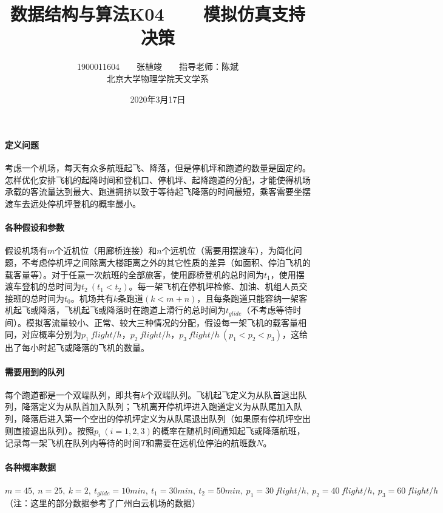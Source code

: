 \documentclass[a4 paper,fontset=windows]{ctexart}
\begin{document}
	\title{\textbf{数据结构与算法K04\ \ \ \ 模拟仿真支持决策}}
	\author{1900011604\ \ \ \ 张植竣\ \ \ \ 指导老师：陈斌\\北京大学物理学院天文学系}
	\date{2020年3月17日}
	\maketitle
	
	\paragraph{定义问题}考虑一个机场，每天有众多航班起飞、降落，但是停机坪和跑道的数量是固定的。怎样优化安排飞机的起降时间和登机口、停机坪、起降跑道的分配，才能使得机场承载的客流量达到最大、跑道拥挤以致于等待起飞降落的时间最短，乘客需要坐摆渡车去远处停机坪登机的概率最小。
	
	\paragraph{各种假设和参数}假设机场有$m$个近机位（用廊桥连接）和$n$个远机位（需要用摆渡车），为简化问题，不考虑停机坪之间除离大楼距离之外的其它性质的差异（如面积、停泊飞机的载客量等）。对于任意一次航班的全部旅客，使用廊桥登机的总时间为$t_1$，使用摆渡车登机的总时间为$t_2\ (t_1<t_2)$。每一架飞机在停机坪检修、加油、机组人员交接班的总时间为$t_0$。机场共有$k$条跑道$(k<m+n)$，且每条跑道只能容纳一架客机起飞或降落，飞机起飞或降落时在跑道上滑行的总时间为$t_{glide}$（不考虑等待时间）。模拟客流量较小、正常、较大三种情况的分配，假设每一架飞机的载客量相同，对应概率分别为$p_1\ flight/h$，$p_2\ flight/h$，$p_3\ flight/h\ (p_1<p_2<p_3)$，这给出了每小时起飞或降落的飞机的数量。	
	
	\paragraph{需要用到的队列}每个跑道都是一个双端队列，即共有$k$个双端队列。飞机起飞定义为从队首退出队列，降落定义为从队首加入队列；飞机离开停机坪进入跑道定义为从队尾加入队列，降落后进入第一个空出的停机坪定义为从队尾退出队列（如果原有停机坪空出则直接退出队列）。按照$p_i\ (i=1,2,3)$的概率在随机时间通知起飞或降落航班，记录每一架飞机在队列内等待的时间$T$和需要在远机位停泊的航班数$N$。
	
	\paragraph{各种概率数据}$m=45,\ n=25,\ k=2,\ t_{glide}=10min,\ t_1=30min,\ t_2=50min,\ p_1=30\ flight/h,\ p_2=40\ flight/h,\ p_3=60\ flight/h$（注：这里的部分数据参考了广州白云机场的数据）
	
\end{document}
